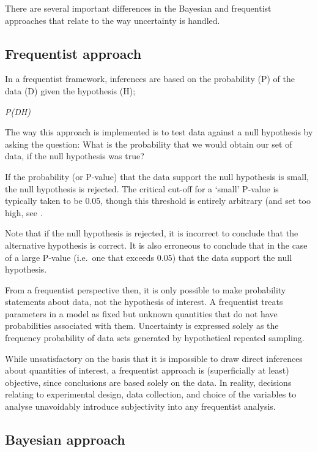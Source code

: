 \documentclass[
]{book}
\begin{document}
There are several important differences in the Bayesian and frequentist approaches that relate to the way uncertainty is handled.

\hypertarget{freq}{%
\subsection{Frequentist approach}\label{freq}}

In a frequentist framework, inferences are based on the probability (P) of the data (D) given the hypothesis (H);

\emph{P(D\textbar H)}

The way this approach is implemented is to test data against a null hypothesis by asking the question: What is the probability that we would obtain our set of data, if the null hypothesis was true?

If the probability (or P-value) that the data support the null hypothesis is small, the null hypothesis is rejected. The critical cut-off for a `small' P-value is typically taken to be 0.05, though this threshold is entirely arbitrary (and set too high, see \citet{Benjamin_2017}.

Note that if the null hypothesis is rejected, it is incorrect to conclude that the alternative hypothesis is correct. It is also erroneous to conclude that in the case of a large P-value (i.e.~one that exceeds 0.05) that the data support the null hypothesis.

From a frequentist perspective then, it is only possible to make probability statements about data, not the hypothesis of interest. A frequentist treats parameters in a model as fixed but unknown quantities that do not have probabilities associated with them. Uncertainty is expressed solely as the frequency probability of data sets generated by hypothetical repeated sampling.

While unsatisfactory on the basis that it is impossible to draw direct inferences about quantities of interest, a frequentist approach is (superficially at least) objective, since conclusions are based solely on the data. In reality, decisions relating to experimental design, data collection, and choice of the variables to analyse unavoidably introduce subjectivity into any frequentist analysis.

\hypertarget{bayesian}{%
\subsection{Bayesian approach}\label{bayesian}}
\end{document}
